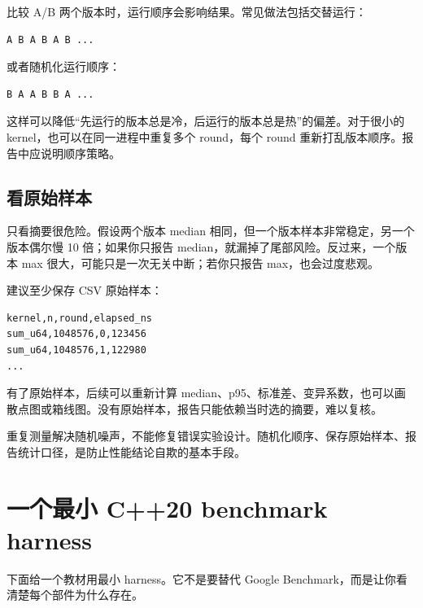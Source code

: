 比较 A/B 两个版本时，运行顺序会影响结果。常见做法包括交替运行：

\begin{lstlisting}
A B A B A B ...
\end{lstlisting}

或者随机化运行顺序：

\begin{lstlisting}
B A A B B A ...
\end{lstlisting}

这样可以降低“先运行的版本总是冷，后运行的版本总是热”的偏差。对于很小的 kernel，也可以在同一进程中重复多个 round，每个 round 重新打乱版本顺序。报告中应说明顺序策略。

\subsection{看原始样本}

只看摘要很危险。假设两个版本 median 相同，但一个版本样本非常稳定，另一个版本偶尔慢 10 倍；如果你只报告 median，就漏掉了尾部风险。反过来，一个版本 max 很大，可能只是一次无关中断；若你只报告 max，也会过度悲观。

建议至少保存 CSV 原始样本：

\begin{lstlisting}
kernel,n,round,elapsed_ns
sum_u64,1048576,0,123456
sum_u64,1048576,1,122980
...
\end{lstlisting}

有了原始样本，后续可以重新计算 median、p95、标准差、变异系数，也可以画散点图或箱线图。没有原始样本，报告只能依赖当时选的摘要，难以复核。

\begin{keyidea}
重复测量解决随机噪声，不能修复错误实验设计。随机化顺序、保存原始样本、报告统计口径，是防止性能结论自欺的基本手段。
\end{keyidea}

\section{一个最小 C++20 benchmark harness}

下面给一个教材用最小 harness。它不是要替代 Google Benchmark，而是让你看清楚每个部件为什么存在。

